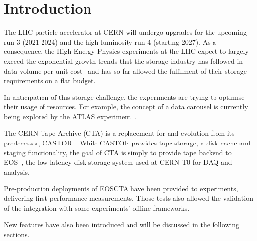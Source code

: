 \documentclass{webofc}
\begin{document}
\maketitle

\section{Introduction}
\label{introduction}
The LHC particle accelerator at CERN will undergo upgrades for the upcoming run 3 (2021-2024) and the high luminosity run 4 (starting 2027).
As a consequence, the High Energy Physics experiments at the LHC expect to largely exceed \cite{atlas_future_chep2018} the exponential growth trends that the storage industry has followed in 
data volume per unit cost~\cite{Insic_roadmap_2019} and has so far allowed the fulfilment of their storage requirements on a flat budget.

In anticipation of this storage challenge, the experiments are trying to optimise their usage of resources. For example, the concept of a data carousel is
currently being explored by the ATLAS experiment~\cite{atlas_data_carousel_update_2018}.

The CERN Tape Archive (CTA) is a replacement for and evolution from its predecessor, CASTOR~\cite{castor2007}. While CASTOR provides tape
storage, a disk cache and staging functionality, the goal of CTA is simply to provide tape backend to EOS~\cite{Peters_2011}, the low latency
disk storage system used at CERN T0 for DAQ and analysis.

Pre-production deployments of EOSCTA have been provided to experiments, delivering first performance measurements. Those tests also allowed the validation
of the integration with some experiments' offline frameworks.

New features have also been introduced and will be discussed in the following sections.


%
%
\end{document}
